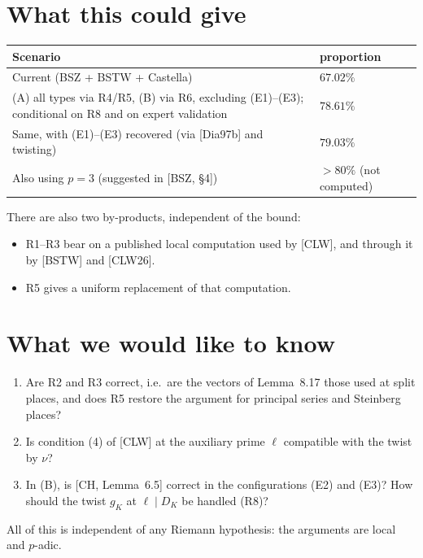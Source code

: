 \documentclass[11pt]{amsart}
\begin{document}
\section{What this could give}
\begin{center}\small
\begin{tabular}{p{8.3cm}l}
\toprule
Scenario & proportion\\ \midrule
Current (BSZ + BSTW + Castella) & $67.02\%$\\
(A) all types via R4/R5, (B) via R6, excluding (E1)--(E3); conditional on R8 and on expert validation & $\mathbf{78.61\%}$\\
Same, with (E1)--(E3) recovered (via [Dia97b] and twisting) & $79.03\%$\\
Also using $p=3$ (suggested in [BSZ, \S4]) & $>80\%$ (not computed)\\ \bottomrule
\end{tabular}
\end{center}
\noindent There are also two by-products, independent of the bound:
\begin{itemize}
\item R1--R3 bear on a published local computation used by [CLW], and through it by [BSTW] and [CLW26].
\item R5 gives a uniform replacement of that computation.
\end{itemize}

\section{What we would like to know}
\begin{enumerate}
\item Are R2 and R3 correct, i.e.\ are the vectors of Lemma~8.17 those used at split places, and does R5 restore the argument for principal series and Steinberg places?
\item Is condition (4) of [CLW] at the auxiliary prime $\ell$ compatible with the twist by $\nu$?
\item In (B), is [CH, Lemma~6.5] correct in the configurations (E2) and (E3)? How should the twist $g_K$ at $\ell\mid D_K$ be handled (R8)?
\end{enumerate}
All of this is independent of any Riemann hypothesis: the arguments are local and $p$-adic.
\end{document}
